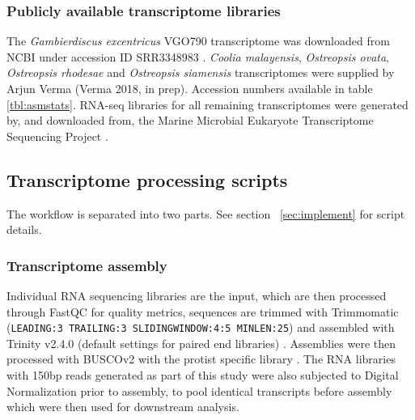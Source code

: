 \documentclass[12pt]{article}
\begin{document}
\subsubsection{Publicly available transcriptome libraries}
The \emph{Gambierdiscus excentricus} VGO790 transcriptome was downloaded from NCBI under accession ID SRR3348983 \cite{kohli2017role}. 
\textit{Coolia malayensis}, \textit{Ostreopsis ovata}, \textit{Ostreopsis rhodesae} and \textit{Ostreopsis siamensis} transcriptomes were supplied by Arjun Verma (Verma 2018, in prep). 
Accession numbers available in table \ref{tbl:asmstats}. 
RNA-seq libraries for all remaining transcriptomes were generated by, and downloaded from, the Marine Microbial Eukaryote Transcriptome Sequencing Project \citep{keeling2014marine}.

\subsection{Transcriptome processing scripts}
\label{sec:trans-processing}
The workflow is separated into two parts. 
See section ~\ref{sec:implement} for script details.
\subsubsection{Transcriptome assembly}
Individual RNA sequencing libraries are the input, which are then processed through FastQC \cite{fastqc} for quality metrics, sequences are trimmed with Trimmomatic (\texttt{LEADING:3 TRAILING:3 SLIDINGWINDOW:4:5 MINLEN:25}) \cite{bolger2014trimmomatic} and assembled with Trinity v2.4.0 (default settings for paired end libraries) \cite{haas2013novo}. 
Assemblies were then processed with BUSCOv2 with the protist specific library \cite{simao2015busco}.
The RNA libraries with 150bp reads generated as part of this study were also subjected to Digital Normalization \cite{diginorm} prior to assembly, to pool identical transcripts before assembly which were then used for downstream analysis.                                                                                                                                                                                                                                                                                                                                                                                                                                                                                                                                                                                                                                                                                                                                                                                                                                                                                                                                                                                                                                                                                                                                                                                                                                                                                                                                        
\end{document}
